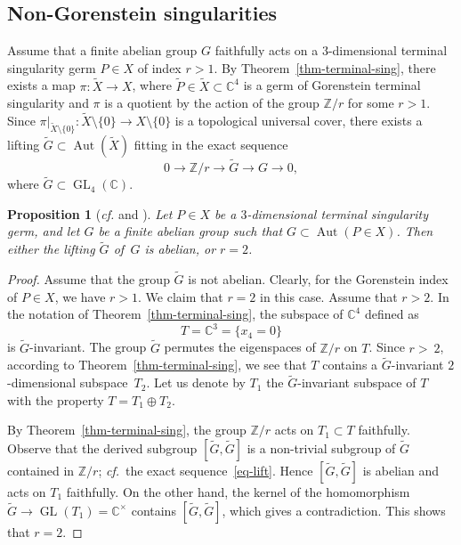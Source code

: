 \documentclass[11pt]{amsart}
\numberwithin{equation}{section}
\newtheorem{proposition}[thm]{Proposition}
\theoremstyle{definition}
\theoremstyle{remark}
\newcommand{\lra}{\longrightarrow}
\DeclareMathOperator{\Aut}{Aut}
\DeclareMathOperator{\GL}{GL}
\begin{document}
\subsection{Non-Gorenstein singularities}
Assume that a finite abelian group $G$ faithfully acts on a $3$-dimensional terminal singularity germ $P\in X$ of index $r>1$.  By Theorem~\ref{thm-terminal-sing}, there exists a map $\pi\colon \widetilde{X}\to X$, where $\widetilde{P}\in \widetilde{X}\subset\mathbb{C}^4$ is a germ of Gorenstein terminal singularity and $\pi$ is a quotient by the action of the group $\mathbb{Z}/r$ for some $r>1$. Since $\pi|_{\widetilde{X}\setminus\{0\}}\colon\widetilde{X}\setminus\{0\}\to X\setminus\{0\}$ is a topological universal cover, there exists a lifting $\widetilde{G}\subset \Aut(\widetilde{X})$ fitting in the exact sequence
\begin{equation}
\label{eq-lift}
0\lra \mathbb{Z}/r \lra \widetilde{G} \lra G \lra 0, 
\end{equation}
where 
$\widetilde{G}\subset\GL_4(\mathbb{C})$. 


\begin{proposition}[\textit{cf.} {\cite[Lemma 2.4]{Pr11} and \cite[Lemma 2.1]{Pr14}}]
\label{prop-action-on-non-gorenstein-points}
Let $P\in X$ be a $3$-dimensional terminal singularity germ, and let $G$ be a finite abelian group such that $G\subset \Aut(P\in X)$. 
Then either the lifting $\widetilde{G}$ of\, $G$ is abelian, or $r=2$.
\end{proposition}

\begin{proof}
Assume that the group $\widetilde{G}$ is not abelian. Clearly, for the Gorenstein index of $P\in X$, we have $r>1$.  We claim that $r=2$ in this case. Assume that $r>2$.  In the notation of Theorem~\ref{thm-terminal-sing}, the subspace of $\mathbb{C}^4$ defined as
\[
T=\mathbb{C}^3=\{x_4=0\}
\] 
is $\widetilde{G}$-invariant. The group $\widetilde{G}$ permutes the eigenspaces of $\mathbb{Z}/r$ on $T$. Since $r>~2$, according to Theorem~\ref{thm-terminal-sing}, we see that $T$ contains a $\widetilde{G}$-invariant $2$-dimensional subspace~$T_2$. Let us denote by $T_1$ the $\widetilde{G}$-invariant subspace of $T$ with the property $T=T_1\oplus T_2$.

By Theorem~\ref{thm-terminal-sing}, the group $\mathbb{Z}/r$ acts on $T_1\subset T$ faithfully.
Observe that the derived subgroup $[\widetilde{G},\widetilde{G}]$ is a non-trivial subgroup of $\widetilde{G}$ contained in $\mathbb{Z}/r$; \textit{cf.}~the exact sequence~\eqref{eq-lift}. Hence $[\widetilde{G},\widetilde{G}]$ is abelian and acts on $T_1$ faithfully. On the other hand, the kernel of the homomorphism $\widetilde{G}\to\GL(T_1)=\mathbb{C}^\times$ contains $[\widetilde{G},\widetilde{G}]$, which gives a contradiction.
This shows that $r=2$.
\end{proof}
\end{document}
